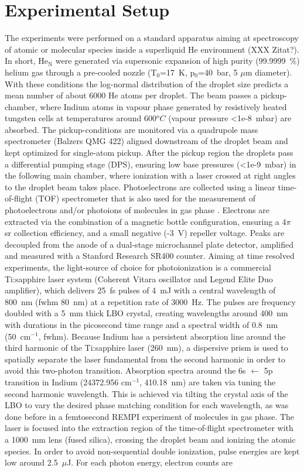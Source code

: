 \documentclass[twoside,twocolumn,9pt]{article}
\begin{document}
\section{Experimental Setup}
The experiments were performed on a standard apparatus aiming at spectroscopy of atomic or molecular species inside a superliquid He environment (XXX Zitat?). In short, He$_\mathrm{N}$ were generated via supersonic expansion of high purity (99.9999~\%) helium gas through a pre-cooled nozzle (T$_\mathrm{0}$=17~K, p$_\mathrm{0}$=40~bar, 5 $\mu$m diameter). With these conditions the log-normal distribution of the droplet size predicts a mean number of about 6000 He atoms\cite{Harms1998:dropletsize} per droplet. The beam passes a pickup-chamber, where Indium atoms in vapour phase generated by resistively heated tungsten cells at temperatures around 600$^{o}C$ (vapour pressure <1e-8~mbar) are absorbed. The pickup-conditions are monitored via a quadrupole mass spectrometer (Balzers QMG 422) aligned downstream of the droplet beam and kept optimized for single-atom pickup. After the pickup region the droplets pass a differential pumping stage (DPS), ensuring low base pressures (<1e-9~mbar) in the following main chamber, where ionization with a laser crossed at right angles to the droplet beam takes place. Photoelectrons are collected using a linear time-of-flight (TOF) spectrometer that is also used for the measurement of photoelectrons and/or photoions of molecules in gas phase \cite{Maierhofer:2016acetone}. Electrons are extracted via the combination of a magnetic bottle configuration, ensuring a 4$\pi$ sr collection efficiency, and a small negative (-3~V) repeller voltage. Peaks are decoupled from the anode of a dual-stage microchannel plate detector, amplified and measured with a Stanford Research SR400 counter. Aiming at time resolved experiments, the light-source of choice for photoionization is a commercial Ti:sapphire laser system (Coherent Vitara oscillator and Legend Elite Duo amplifier), which delivers 25~fs pulses of 4~mJ with a central wavelength of 800~nm (fwhm 80~nm) at a repetition rate of 3000~Hz. The pulses are frequency doubled with a 5~mm thick LBO crystal, creating wavelengths around 400~nm with durations in the picosecond time range and a spectral width of 0.8~nm (50~cm$^{-1}$, fwhm). Because Indium has a persistent absorption line around the third harmonic of the Ti:sapphire laser (260~nm)\cite{NIST}, a dispersive prism is used to spatially separate the laser fundamental from the second harmonic in order to avoid this two-photon transition. Absorption spectra around the 6s $\leftarrow$ 5p transition in Indium (24372.956 cm$^{-1}$, 410.18~nm) are taken via tuning the second harmonic wavelength. This is achieved via tilting the crystal axis of the LBO to vary the desired phase matching condition for each wavelength, as was done before in a femtosecond REMPI experiment of molecules in gas phase\cite{koch2017direct}. The laser is focused into the extraction region of the time-of-flight spectrometer with a 1000~mm lens (fused silica), crossing the droplet beam and ionizing the atomic species. In order to avoid non-sequential double ionization, pulse energies are kept low around 2.5~$\mu$J. For each photon energy, electron counts are 
\end{document}
